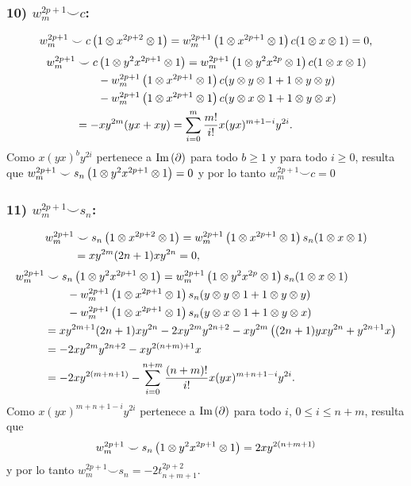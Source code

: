 \documentclass[fleqn,../tesis.tex]{subfiles}
\begin{document}
\subsubsection{10) $w_m^{2p + 1} \smile c$:}
\begin{align*}
	w_m^{2p + 1} \smile c\left(1 \otimes x^{2p + 2} \otimes 1\right)
		= w_m^{2p + 1}\left(1 \otimes x^{2p + 1} \otimes 1\right)c(1 \otimes x \otimes 1) = 0,
\end{align*}
\begin{align*}
	w_m^{2p + 1}& \smile c\left(1 \otimes y^2x^{2p + 1} \otimes 1\right)
		= w_m^{2p + 1}\left(1 \otimes y^2 x^{2p} \otimes 1\right)c(1 \otimes x \otimes 1)\\
	&\qquad- w_m^{2p + 1}\left(1 \otimes x^{2p + 1} \otimes 1\right)c(y \otimes y \otimes 1 + 1 \otimes y \otimes y)\\
	&\qquad -w_m^{2p + 1}\left(1 \otimes x^{2p + 1} \otimes 1\right)c(y \otimes x \otimes 1 + 1 \otimes y \otimes x)\\
	&= -xy^{2m}(yx+ xy) = \sum_{i = 0}^{m}\frac{m!}{i!}x(yx)^{m + 1 - i}y^{2i}.
\end{align*}
Como $x(yx)^{b}y^{2i}$ pertenece a $\operatorname{Im}\left(\partial\right)$ para todo $b\geq 1$ y para todo
$i \geq 0$, resulta que $w_m^{2p + 1}\smile s_n\left(1 \otimes y^2x^{2p + 1} \otimes 1\right) = 0$
y por lo tanto $w_m^{2p + 1} \smile c = 0$
\subsubsection{11) $w_m^{2p + 1} \smile s_n$:}
\begin{align*}
	w_m^{2p + 1} &\smile s_n\left(1 \otimes x^{2p + 2} \otimes 1\right)
		= w_m^{2p + 1}\left(1 \otimes x^{2p + 1} \otimes 1\right)s_n(1 \otimes x \otimes 1)\\
	&= xy^{2m}(2n + 1)xy^{2n} = 0,
\end{align*}	
\begin{align*}
	w_m^{2p + 1}& \smile s_n\left(1 \otimes y^2x^{2p + 1} \otimes 1\right)
		= w_m^{2p + 1}\left(1 \otimes y^2 x^{2p} \otimes 1\right)s_n(1 \otimes x \otimes 1)\\
	&\qquad -w_m^{2p + 1}\left(1 \otimes x^{2p + 1} \otimes 1\right)s_n(y \otimes y \otimes 1 + 1 \otimes y \otimes y)\\
	&\qquad -w_m^{2p + 1}\left(1 \otimes x^{2p + 1} \otimes 1\right)s_n(y \otimes x \otimes 1 + 1 \otimes y \otimes x)\\
	&= xy^{2m + 1}(2n + 1)xy^{2n} -2xy^{2m}y^{2n + 2} - xy^{2m}\left((2n + 1)yxy^{2n} + y^{2n + 1}x\right)\\
	&= -2xy^{2m}y^{2n + 2} -xy^{2(n + m) + 1}x\\
	&= -2xy^{2(m + n + 1)}
		-\sum_{i = 0}^{n +m}\frac{(n + m)!}{i!}x(yx)^{m  + n  + 1 -i}y^{2i}.
\end{align*}
Como $x(yx)^{m  + n  + 1 -i}y^{2i}$ pertenece a $\operatorname{Im}\left(\partial\right)$ para todo $i$, $0 \leq i \leq n + m$,
resulta que \[w_m^{2p + 1} \smile s_n\left(1 \otimes y^2x^{2p + 1} \otimes 1\right) = 2xy^{2(n + m + 1)}\]
y por lo tanto $w_m^{2p + 1} \smile s_n = -2t_{n + m + 1}^{2p + 2}$.
\end{document}
